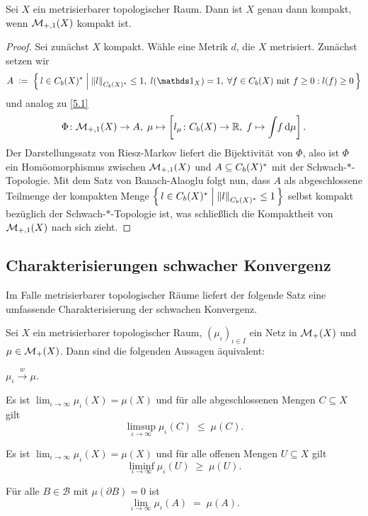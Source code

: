 \documentclass[../main/main.tex]{subfiles}
\begin{document}
	\begin{Satz}
		Sei $X$ ein metrisierbarer topologischer Raum. Dann ist $X$ genau dann kompakt, wenn $\mathcal{M}_{+,1}(X)$ kompakt ist.
	\end{Satz}
	
	\begin{proof}
		Sei zunächst $X$ kompakt. Wähle eine Metrik $d$, die $X$ metrisiert.
		Zunächst setzen wir
		\[ A \; \defby \; \setcomp{l \in \Bdcontfct{X}^\ast}{\norm{l}_{\Bdcontfct{X}^\ast} \leq 1, \; l(\indfct_{X}) = 1, \; 
			\forall f \in \Bdcontfct{X} \text{ mit } f \geq 0 : l(f) \geq 0}\]
		und analog zu \eqref{5.1}
		\[ \Phi \colon \mathcal{M}_{+,1}(X) \to A, \; \mu \mapsto \left[l_\mu \colon C_b(X) \to \mathbb{R}, \; f \mapsto \int_{} \, f \, \mathrm{d}\mu \right]  \text{.} \]
		Der Darstellungssatz von Riesz-Markov liefert die Bijektivität von $\Phi$, also ist $\Phi$ ein 
		Homöomorphismus zwischen $\mathcal{M}_{+,1}(X)$ und $A \subseteq C_b(X)^\ast$ 
		mit der Schwach-$\ast$-Topologie. Mit dem Satz von Banach-Alaoglu folgt nun, dass $A$ als abgeschlossene Teilmenge der kompakten Menge 
		$\left\{\, l \in C_b(X)^\ast \; \middle| \; \left\lVert l\right\rVert_{C_b(X)^\ast} \leq 1 \,\right\}$ selbst kompakt bezüglich der Schwach-$\ast$-Topologie ist, 
		was schließlich die Kompaktheit von $\mathcal{M}_{+,1}(X)$ nach sich zieht.
	\end{proof}

	
	\subsection{Charakterisierungen schwacher Konvergenz}
	
	Im Falle metrisierbarer topologischer Räume liefert der folgende Satz eine umfassende Charakterisierung der schwachen Konvergenz.
	
	\begin{Satz}[Portmanteau]
		Sei $X$ ein metrisierbarer topologischer Raum, $(\mu_\iota)_{\iota \in I}$ ein Netz in $\mathcal{M}_{+}(X)$
		und $\mu \in \mathcal{M}_{+}(X)$. Dann sind die folgenden Aussagen äquivalent:
		\begin{equivalentthm}
			\item $\mu_\iota \xrightarrow{w} \mu$.
			\item Es ist 
			$\lim_{\iota \to \infty} \mu_\iota(X) = \mu(X)$
			und für alle abgeschlossenen Mengen $C \subseteq X$ gilt 
			$$\limsup_{\iota \to \infty} \mu_\iota(C) \; \leq \; \mu(C) \text{.}$$
			\item Es ist 
			$\lim_{\iota \to \infty} \mu_\iota(X) = \mu(X)$
			und für alle offenen Mengen $U \subseteq X$ gilt 
			$$\liminf_{\iota \to \infty} \mu_\iota(U) \; \geq \; \mu(U) \text{.}$$
			\item Für alle $B \in \mathcal{B}$ mit $\mu(\partial B) = 0$ 
			ist $$\lim_{\iota \to \infty} \mu_\iota(A) \; = \; \mu(A) \text{.}$$
		\end{equivalentthm}
	\end{Satz}
\end{document}
